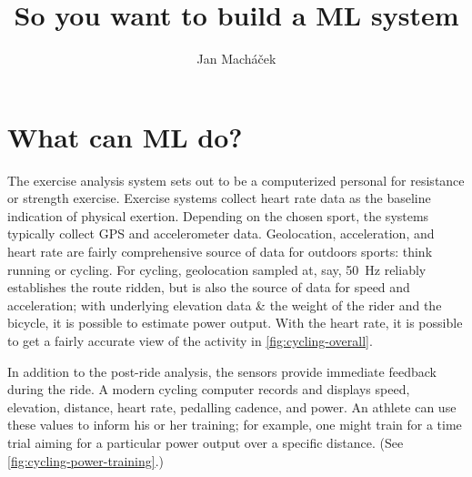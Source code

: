 




\title{So you want to build a ML system}

\author{Jan Macháček}




\section{What can ML do?}
The exercise analysis system sets out to be a computerized personal for resistance or strength exercise. Exercise systems collect heart rate data as the baseline indication of physical exertion. Depending on the chosen sport, the systems typically collect GPS and accelerometer data. Geolocation, acceleration, and heart rate are fairly comprehensive source of data for outdoors sports: think running or cycling. For cycling, geolocation sampled at, say, \SI{50}{\hertz} reliably establishes the route ridden, but is also the source of data for speed and acceleration; with underlying elevation data \& the weight of the rider and the bicycle, it is possible to estimate power output. With the heart rate, it is possible to get a  fairly accurate view of the activity in \autoref{fig:cycling-overall}.


In addition to the post-ride analysis, the sensors provide immediate feedback during the ride. A modern cycling computer records and displays speed, elevation, distance, heart rate, pedalling cadence, and power. An athlete can use these values to inform his or her training; for example, one might train for a time trial aiming for a particular power output over a specific distance. (See \autoref{fig:cycling-power-training}.)

